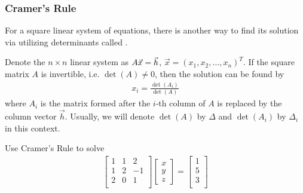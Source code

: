 \subsubsection{Cramer's Rule}
For a square linear system of equations, there is another way to find its solution via utilizing determinants called .
\begin{thm}
Denote the $n\times n$ linear system as $A\vec{x} = \smash{\vec{h}}$, $\vec{x} = (x_1, x_2, \ldots, x_n)^T$. If the square matrix $A$ is invertible, i.e. $\det(A) \neq 0$, then the solution can be found by
\begin{align}
x_i = \frac{\det(A_i)}{\det(A)}
\end{align}
where $A_i$ is the matrix formed after the $i$-th column of $A$ is replaced by the column vector $\vec{h}$. Usually, we will denote $\det(A)$ by $\Delta$ and $\det(A_i)$ by $\Delta_i$ in this context.
\end{thm}
\begin{exmp}
Use Cramer's Rule to solve
\begin{align*}
\begin{bmatrix}
1 & 1 & 2 \\
1 & 2 & -1 \\
2 & 0 & 1 \\
\end{bmatrix}
\begin{bmatrix}
x \\
y \\
z 
\end{bmatrix}
=
\begin{bmatrix}
1 \\
5 \\
3 \\
\end{bmatrix}   
\end{align*}
\end{exmp}
